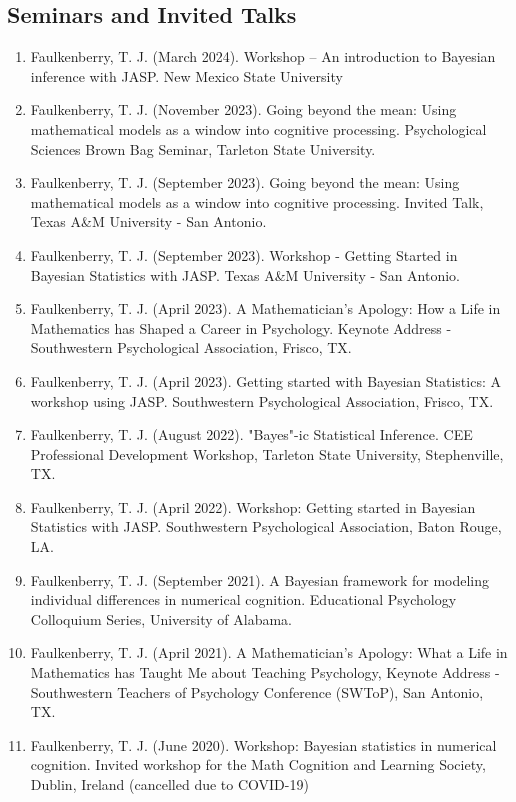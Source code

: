 \documentclass[article,10pt]{article}
\begin{document}
\subsection*{Seminars and Invited Talks}
\label{sec:org1aea743}
\begin{enumerate}
\item Faulkenberry, T. J. (March 2024). Workshop -- An introduction to Bayesian inference with JASP. New Mexico State University
\item Faulkenberry, T. J. (November 2023). Going beyond the mean: Using mathematical models as a window into cognitive processing. Psychological Sciences Brown Bag Seminar, Tarleton State University.
\item Faulkenberry, T. J. (September 2023). Going beyond the mean: Using mathematical models as a window into cognitive processing. Invited Talk, Texas A\&M University - San Antonio.
\item Faulkenberry, T. J. (September 2023). Workshop - Getting Started in Bayesian Statistics with JASP. Texas A\&M University - San Antonio.
\item Faulkenberry, T. J. (April 2023). A Mathematician's Apology: How a Life in Mathematics has Shaped a Career in Psychology. Keynote Address - Southwestern Psychological Association, Frisco, TX.
\item Faulkenberry, T. J. (April 2023). Getting started with Bayesian Statistics: A workshop using JASP. Southwestern Psychological Association, Frisco, TX.
\item Faulkenberry, T. J. (August 2022). "Bayes"-ic Statistical Inference. CEE Professional Development Workshop, Tarleton State University, Stephenville, TX.
\item Faulkenberry, T. J. (April 2022). Workshop: Getting started in Bayesian Statistics with JASP. Southwestern Psychological Association, Baton Rouge, LA.
\item Faulkenberry, T. J. (September 2021). A Bayesian framework for modeling individual differences in numerical cognition. Educational Psychology Colloquium Series, University of Alabama.
\item Faulkenberry, T. J. (April 2021). A Mathematician's Apology: What a Life in Mathematics has Taught Me about Teaching Psychology,  Keynote Address - Southwestern Teachers of Psychology Conference (SWToP), San Antonio, TX.
\item Faulkenberry, T. J. (June 2020). Workshop: Bayesian statistics in numerical cognition. Invited workshop for the Math Cognition and Learning Society, Dublin, Ireland (cancelled due to COVID-19)

\end{enumerate}
\end{document}
